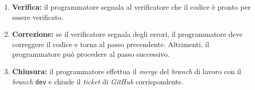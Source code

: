\begin{itemize}
\begin{enumerate}
		      \item \textbf{Verifica:} il programmatore segnala al
		            verificatore che il codice è pronto per essere verificato.

		      \item \textbf{Correzione:} se il verificatore segnala degli
		            errori, il programmatore deve correggere il codice e torna
		            al passo precendente. Altrimenti, il programmatore può
		            procedere al passo successivo.

		      \item \textbf{Chiusura:} il programmatore effettua il
		            \textit{merge} del \textit{branch} di lavoro con il
		            \textit{branch} \texttt{dev} e chiude il \textit{ticket} di
		            \textit{GitHub} corrispondente.
	      \end{enumerate}
\end{itemize}
